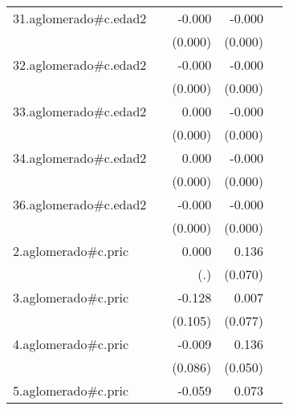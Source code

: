 {\begin{longtable}{l*{4}{D{.}{.}{-1}}}
\addlinespace
31.aglomerado#c.edad2&                     &      -0.000         &      -0.000\sym{***}&                     \\
            &                     &     (0.000)         &     (0.000)         &                     \\
\addlinespace
32.aglomerado#c.edad2&                     &      -0.000         &      -0.000\sym{***}&                     \\
            &                     &     (0.000)         &     (0.000)         &                     \\
\addlinespace
33.aglomerado#c.edad2&                     &       0.000         &      -0.000\sym{**} &                     \\
            &                     &     (0.000)         &     (0.000)         &                     \\
\addlinespace
34.aglomerado#c.edad2&                     &       0.000         &      -0.000\sym{*}  &                     \\
            &                     &     (0.000)         &     (0.000)         &                     \\
\addlinespace
36.aglomerado#c.edad2&                     &      -0.000         &      -0.000\sym{**} &                     \\
            &                     &     (0.000)         &     (0.000)         &                     \\
\addlinespace
2.aglomerado#c.pric&                     &       0.000         &       0.136         &                     \\
            &                     &         (.)         &     (0.070)         &                     \\
\addlinespace
3.aglomerado#c.pric&                     &      -0.128         &       0.007         &                     \\
            &                     &     (0.105)         &     (0.077)         &                     \\
\addlinespace
4.aglomerado#c.pric&                     &      -0.009         &       0.136\sym{**} &                     \\
            &                     &     (0.086)         &     (0.050)         &                     \\
\addlinespace
5.aglomerado#c.pric&                     &      -0.059         &       0.073         &                     \\

\end{longtable}}
